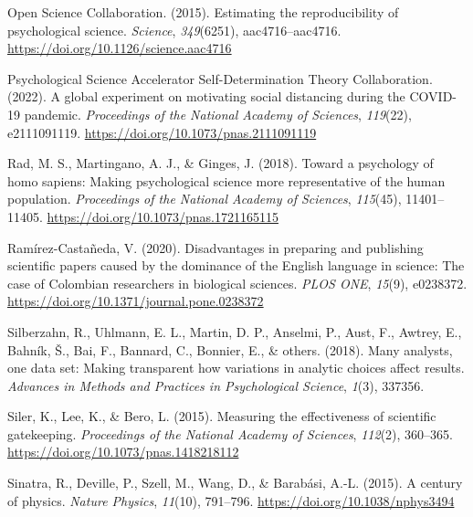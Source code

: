 \documentclass[
  man,mask,floatsintext]{apa7}
\newlength{\cslhangindent}
\newlength{\cslentryspacingunit} %
\newenvironment{CSLReferences}[2] %
 {%
  \setlength{\parindent}{0pt}
  \ifodd #1
  \let\oldpar\par
  \def\par{\hangindent=\cslhangindent\oldpar}
  \fi
  \setlength{\parskip}{#2\cslentryspacingunit}
 }%
 {}
\begin{document}
\begin{CSLReferences}{1}{0}
\leavevmode{}%
Open Science Collaboration. (2015). Estimating the reproducibility of psychological science. \emph{Science}, \emph{349}(6251), aac4716--aac4716. \url{https://doi.org/10.1126/science.aac4716}

\leavevmode{}%
Psychological Science Accelerator Self-Determination Theory Collaboration. (2022). A global experiment on motivating social distancing during the COVID-19 pandemic. \emph{Proceedings of the National Academy of Sciences}, \emph{119}(22), e2111091119. \url{https://doi.org/10.1073/pnas.2111091119}

\leavevmode{}%
Rad, M. S., Martingano, A. J., \& Ginges, J. (2018). Toward a psychology of homo sapiens: Making psychological science more representative of the human population. \emph{Proceedings of the National Academy of Sciences}, \emph{115}(45), 11401--11405. \url{https://doi.org/10.1073/pnas.1721165115}

\leavevmode{}%
Ramírez-Castañeda, V. (2020). Disadvantages in preparing and publishing scientific papers caused by the dominance of the English language in science: The case of Colombian researchers in biological sciences. \emph{PLOS ONE}, \emph{15}(9), e0238372. \url{https://doi.org/10.1371/journal.pone.0238372}

\leavevmode{}%
Silberzahn, R., Uhlmann, E. L., Martin, D. P., Anselmi, P., Aust, F., Awtrey, E., Bahník, Š., Bai, F., Bannard, C., Bonnier, E., \& others. (2018). Many analysts, one data set: Making transparent how variations in analytic choices affect results. \emph{Advances in Methods and Practices in Psychological Science}, \emph{1}(3), 337356.

\leavevmode{}%
Siler, K., Lee, K., \& Bero, L. (2015). Measuring the effectiveness of scientific gatekeeping. \emph{Proceedings of the National Academy of Sciences}, \emph{112}(2), 360--365. \url{https://doi.org/10.1073/pnas.1418218112}

\leavevmode{}%
Sinatra, R., Deville, P., Szell, M., Wang, D., \& Barabási, A.-L. (2015). A century of physics. \emph{Nature Physics}, \emph{11}(10), 791--796. \url{https://doi.org/10.1038/nphys3494}


\end{CSLReferences}
\end{document}
